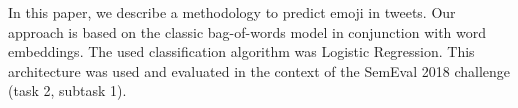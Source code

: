 In this paper, we describe a methodology to predict emoji in tweets. Our approach is based on the classic bag-of-words model in conjunction with word embeddings. The used classification algorithm was Logistic Regression. This architecture was used and evaluated in the context of the SemEval 2018 challenge (task 2, subtask 1).
